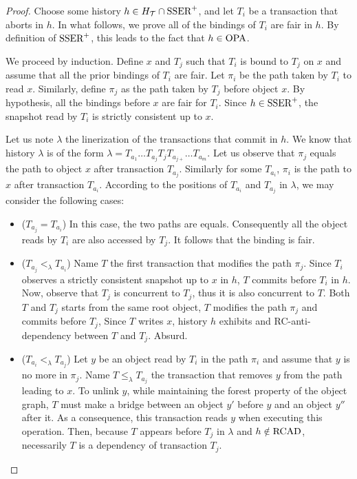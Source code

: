 \begin{proof}
  Choose some history $h \in H_{\mathcal{T}} \inter \SPSER$, and let $T_i$ be a transaction that aborts in $h$.
  In what follows, we prove all of the bindings of $T_i$ are fair in $h$.
  By definition of $\SPSER$, this leads to the fact that $h \in \OPA$.

  We proceed by induction.
  Define $x$ and $T_j$ such that $T_i$ is bound to $T_j$ on $x$ and assume that all the prior bindings of $T_i$ are fair.
  Let $\pi_i$ be the path taken by $T_i$ to read $x$.
  Similarly, define $\pi_j$ as the path taken by $T_j$ before object $x$.
  By hypothesis, all the bindings before $x$ are fair for $T_i$.
  Since $h \in \SPSER$, the snapshot read by $T_i$ is strictly consistent up to $x$.

  Let us note $\lambda$ the linerization of the transactions that commit in $h$.
  We know that history $\lambda$ is of the form $\lambda=T_{a_1} \ldots T_{a_j} T_j T_{a_{j+}} \ldots T_{a_m}$.
  Let us observe that $\pi_j$ equals the path to object $x$ after transaction $T_{a_j}$.
  Similarly for some $T_{a_i}$, $\pi_i$ is the path to $x$ after transaction $T_{a_i}$.  
  According to the positions of $T_{a_i}$ and $T_{a_j}$ in $\lambda$, we may consider the following cases:
  \begin{itemize}
  \item ($T_{a_j} = T_{a_i}$)
    In this case, the two paths are equals.
    Consequently all the object reads by $T_i$ are also accessed by $T_j$.
    It follows that the binding is fair.    
  \item ($T_{a_j} <_{\lambda} T_{a_i}$)
    Name $T$ the first transaction that modifies the path $\pi_j$.
    Since $T_i$ observes a strictly consistent snapshot up to $x$ in $h$, $T$ commits before $T_i$ in $h$.
    Now, observe that $T_j$ is concurrent to $T_j$, thus it is also concurrent to $T$.
    Both $T$ and $T_j$ starts from the same root object, $T$ modifies the path $\pi_j$ and commits before $T_j$,
    Since $T$ writes $x$, history $h$ exhibits and RC-anti-dependency between $T$ and $T_j$.
    Absurd.
  \item ($T_{a_i} <_{\lambda} T_{a_j}$)
    Let $y$ be an object read by $T_i$ in the path $\pi_i$ and assume that $y$ is no more in $\pi_j$.
    Name $T \leq_{\lambda} T_{a_j}$ the transaction that removes $y$ from the path leading to $x$.
    To unlink $y$, while maintaining the forest property of the object graph, $T$ must make a bridge between an object $y'$ before $y$ and an object $y''$ after it.
    As a consequence, this transaction reads $y$ when executing this operation.
    Then, because $T$ appears before $T_j$ in $\lambda$ and $h \notin \RCAD$, necessarily $T$ is a dependency of transaction $T_j$.
  \end{itemize}
\end{proof}

